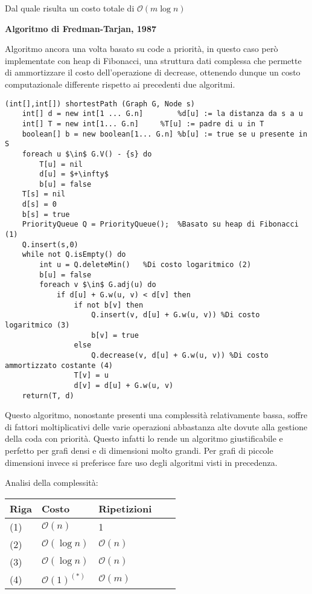 \documentclass[../cheatSheetAlgoritmi.tex]{subfiles}
\begin{document}
\bigskip
Dal quale risulta un costo totale di $\mathcal{O}(m \log n)$
 
\begin{flushleft}
\textbf{Algoritmo di Fredman-Tarjan, 1987}
\end{flushleft}
Algoritmo ancora una volta basato su code a priorità, in questo caso però implementate con heap di Fibonacci, una struttura dati complessa che permette di ammortizzare il costo dell'operazione di decrease, ottenendo dunque un costo computazionale differente rispetto ai precedenti due algoritmi.
\begin{lstlisting}[caption=Algoritmo di Fredman-Tarjan: cammini minimi a sorgente singola]
(int[],int[]) shortestPath (Graph G, Node s)
	int[] d = new int[1 ... G.n]		%d[u] := la distanza da s a u 
	int[] T = new int[1... G.n]		%T[u] := padre di u in T
	boolean[] b = new boolean[1... G.n]	%b[u] := true se u presente in S 
	foreach u $\in$ G.V() - {s} do
		T[u] = nil
		d[u] = $+\infty$
		b[u] = false
	T[s] = nil
	d[s] = 0
	b[s] = true
	PriorityQueue Q = PriorityQueue();	%Basato su heap di Fibonacci (1)
	Q.insert(s,0)
	while not Q.isEmpty() do 
		int u = Q.deleteMin()	%Di costo logaritmico (2)
		b[u] = false
		foreach v $\in$ G.adj(u) do
			if d[u] + G.w(u, v) < d[v] then 
				if not b[v] then
					Q.insert(v, d[u] + G.w(u, v)) %Di costo logaritmico (3)
					b[v] = true
				else
					Q.decrease(v, d[u] + G.w(u, v)) %Di costo ammortizzato costante (4)
				T[v] = u 
				d[v] = d[u] + G.w(u, v)
	return(T, d)
\end{lstlisting}
Questo algoritmo, nonostante presenti una complessità relativamente bassa, soffre di fattori moltiplicativi delle varie operazioni abbastanza alte dovute alla gestione della coda con priorità. Questo infatti lo rende un algoritmo giustificabile e perfetto per grafi densi e di dimensioni molto grandi. Per grafi di piccole dimensioni invece si preferisce fare uso degli algoritmi visti in precedenza.

\bigskip
Analisi della complessità:

\bigskip
\begin{tabular}{@{}lllll@{}}
\toprule
Riga & Costo & Ripetizioni &  &  \\ \midrule
(1) & $\mathcal{O}(n)$     & 1           &  &  \\
(2)    & $\mathcal{O}(\log n)$     & $\mathcal{O}(n)$           &  &  \\
(3)    & $\mathcal{O}(\log n)$     & $\mathcal{O}(n)$           &  &  \\
(4)    & $\mathcal{O}(1)^{(*)}$     & $\mathcal{O}(m)$           &  &  \\ \bottomrule
\end{tabular}
\end{document}
